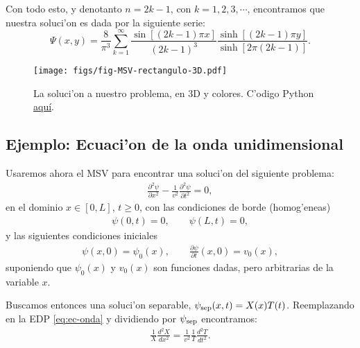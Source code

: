 Con todo esto, y denotanto $n=2k-1$, con $k=1,2,3,\cdots$, encontramos que nuestra soluci'on es dada por la siguiente serie:
\begin{equation}
\Psi(x,y)=\frac{8}{\pi^3}\sum_{k=1}^{\infty}\frac{\sin[(2k-1) \pi x]}{(2k-1)^3}\frac{\sinh[(2k-1)\pi y]}{\sinh[2\pi (2k-1)]}.
\end{equation}

\begin{figure}[H]
\centering
\texttt{[image: figs/fig-MSV-rectangulo-3D.pdf]}
\caption{La soluci'on a nuestro problema, en 3D y colores. C'odigo Python \href{https://github.com/gfrubi/FM2/blob/master/figuras-editables/fig-MSV-Laplace-rectangulo.py}{aqu\'i}.}
\label{fig-SolLap}
\end{figure}

\subsection{Ejemplo: Ecuaci'on de la onda unidimensional}
Usaremos ahora el MSV para encontrar una soluci'on del siguiente problema:
\begin{align}
\frac{\partial^2 \psi}{\partial x^2}-\frac{1}{v^2}\frac{\partial^2 \psi}{\partial t^2}=0,\label{eq:ec-onda}
\end{align}
en el dominio $x\in[0,L]$, $t\ge 0$, con las condiciones de borde (homog'eneas)
\begin{align}
\psi(0,t)=0,\qquad \psi(L,t)=0,\label{eq:cond-borde}
\end{align}
y las siguientes condiciones iniciales 
\begin{align}
\psi(x,0)=\psi_{0}(x),\qquad \frac{\partial \psi}{\partial t}(x,0)=v_{0}(x),\label{eq:cond-inicial}
\end{align}
suponiendo que $\psi_{0}(x)$ y $v_{0}(x)$ son funciones dadas, pero arbitrarias de la variable $x$.


Buscamos entonces una soluci'on separable, $\psi_{\rm sep}(x,t) = X(x)T(t)$. Reemplazando en la EDP \eqref{eq:ec-onda} y dividiendo por $\psi_{\rm sep}$ encontramos:
\begin{align}
\frac{1}{X}\frac{d^2 X}{dx^2}=\frac{1}{v^2}\frac{1}{T}\frac{d^2 T}{dt^2}.\label{eq:ec-separable}
\end{align} 

